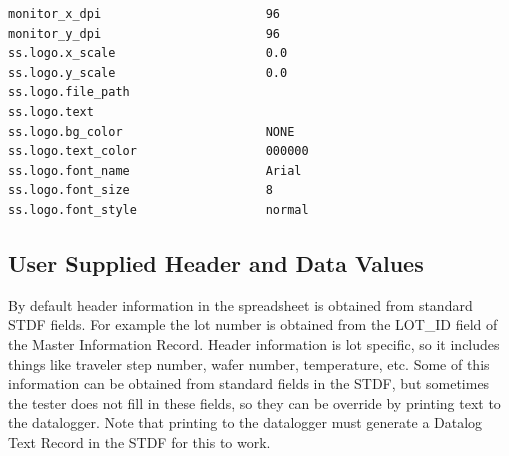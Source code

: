 \documentclass[letterpaper]{article}
\begin{document}
\begin{verbatim}
monitor_x_dpi                       96
monitor_y_dpi                       96
ss.logo.x_scale                     0.0
ss.logo.y_scale                     0.0
ss.logo.file_path           
ss.logo.text
ss.logo.bg_color                    NONE
ss.logo.text_color                  000000
ss.logo.font_name                   Arial
ss.logo.font_size                   8
ss.logo.font_style                  normal
\end{verbatim}
\clearpage

\subsection{\bf User Supplied Header and Data Values}

By default header information in the spreadsheet is obtained from
standard STDF fields.  For example the lot number is obtained
from the LOT\_ID field of the Master Information Record.  Header
information is lot specific, so it includes things like traveler
step number, wafer number, temperature, etc.  Some of this information
can be obtained from standard fields in the STDF, but sometimes
the tester does not fill in these fields, so they can be override 
by printing text to the datalogger.  Note that printing to the datalogger
must generate a Datalog Text Record in the STDF for this to work.
\end{document}
